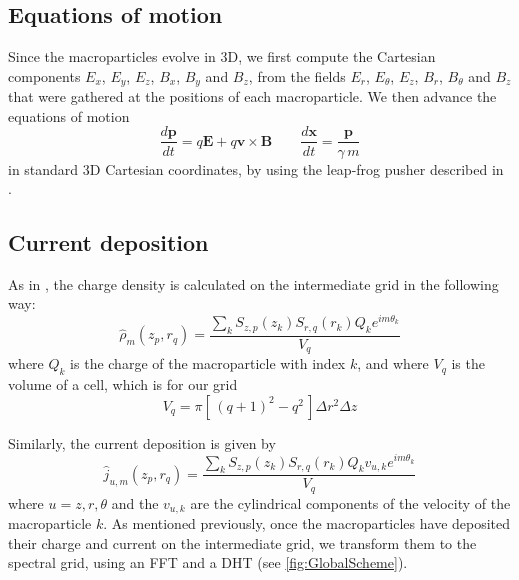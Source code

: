 \documentclass[1p,times]{elsarticle}
\renewcommand{\vec}[1]{\boldsymbol{#1}}
\begin{document}

\subsection{Equations of motion}
\label{sec:eq-motion}

Since the macroparticles evolve in 3D, we first compute
the Cartesian components $E_x$, $E_y$, $E_z$, $B_x$, $B_y$ and
$B_z$, from the fields $E_r$, $E_\theta$, $E_z$, $B_r$, $B_\theta$ and
$B_z$ that were gathered at the positions of each macroparticle. 
We then advance the equations of motion
\begin{equation} \frac{d\vec{p}}{dt} = q\vec{E} + q\vec{v}\times \vec{B} \qquad
\frac{d\vec{x}}{dt} = \frac{\vec{p}}{\gamma \,m} \end{equation}
\noindent  in standard 3D Cartesian coordinates, by using the leap-frog pusher described in \citep{VayPoP2008}.

\subsection{Current deposition}
\label{sec:current-deposition}

As in \citep{Lifschitz}, the charge density is calculated on the intermediate grid in the
following way:
\begin{equation} \hat{\rho}_m(z_p,r_q) = \frac{ \sum_k  S_{z,p}(z_k)S_{r,q}(r_k) Q_k e^{im\theta_k}}{V_{q}} \end{equation}
where $Q_k$ is the charge of the macroparticle with index $k$, and
where $V_q$ is the volume of a cell, which is for our grid
\begin{equation} V_{q} = \pi [\, (q+1)^2- q^2\,] \Delta r^2 \Delta z \end{equation}

\noindent Similarly, the current deposition is given by
\begin{equation} \hat{j}_{u,m}(z_p,r_q) = \frac{\sum_k S_{z,p}(z_k) S_{r,q}(r_k)
Q_k v_{u,k} e^{im\theta_k}}{V_{q}} \end{equation}
where $u = z,r,\theta$ and the $v_{u,k}$ are the cylindrical components of the
velocity of the macroparticle $k$. As mentioned previously, once the
macroparticles have deposited their charge and current on the
intermediate grid, we transform them to the spectral grid, using an
FFT and a DHT (see \cref{fig:GlobalScheme}).
\end{document}
